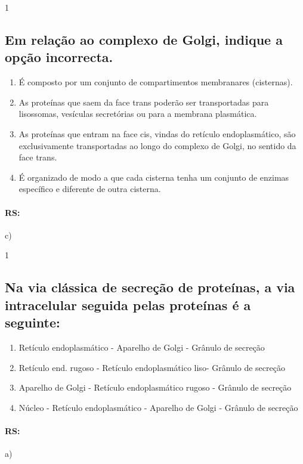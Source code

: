 \documentclass[\mainfilename]{subfiles}
\begin{document}
\begin{questionBox}1{} %
    
    \subsection*{Em relação ao complexo de Golgi, indique a opção incorrecta.}

    \begin{enumerate}[label=\alph{enumi})]
        \item É composto por um conjunto de compartimentos membranares (cisternas).
        \item As proteínas que saem da face trans poderão ser transportadas para lisossomas, vesículas secretórias ou para a membrana plasmática.
        \item As proteínas que entram na face cis, vindas do retículo endoplasmático, são exclusivamente transportadas ao longo do complexo de Golgi, no sentido da face trans. 
        \item É organizado de modo a que cada cisterna tenha um conjunto de enzimas específico e diferente de outra cisterna.
    \end{enumerate}

    \paragraph*{RS:} c)

\end{questionBox}

\begin{questionBox}1{} %
    
    \subsection*{Na via clássica de secreção de proteínas, a via intracelular seguida pelas proteínas é a seguinte:}
    \begin{enumerate}[label=\alph{enumi})]
        \item Retículo endoplasmático - Aparelho de Golgi - Grânulo de secreção
        \item Retículo end. rugoso - Retículo endoplasmático liso- Grânulo de secreção
        \item Aparelho de Golgi - Retículo endoplasmático rugoso - Grânulo de secreção 
        \item Núcleo - Retículo endoplasmático - Aparelho de Golgi - Grânulo de secreção
    \end{enumerate}

    \paragraph*{RS:} a)


\end{questionBox}
\end{document}
